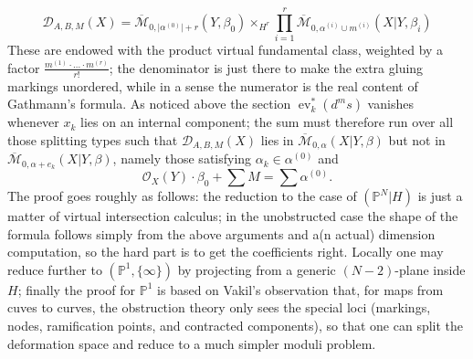 \documentclass[11pt]{amsart}
\newcommand{\M}[4]{\overline{\mathcal{M}}_{#1,#2}(#3,#4)}
\newcommand{\PP}{\mathbb P}
\newcommand{\OO}{\mathcal{O}}
\newcommand{\ev}{\operatorname{ev}}
\theoremstyle{definition}
\theoremstyle{definition}
\begin{document}
\[\mathcal{D}_{A,B,M}(X)=\M{0}{\lvert\alpha^{(0)}\rvert+r}{Y}{\beta_0}\times_{H^r}\prod_{i=1}^r
\M{0}{\alpha^{(i)}\cup m^{(i)}}{X|Y}{\beta_i}\]
These are endowed with the product virtual fundamental class, weighted by a factor $\frac{m^{(1)}\cdot\ldots\cdot m^{(r)}}{r!}$; the denominator is just there to make the extra gluing markings unordered, while in a sense the numerator is the real content of Gathmann's formula. As noticed above the section $\ev_k^*(d^ms)$ vanishes whenever $x_k$ lies on an internal component; the sum must therefore run over all those splitting types such that $\mathcal{D}_{A,B,M}(X)$ lies in $\M{0}{\alpha}{X|Y}{\beta}$ but not in $\M{0}{\alpha+e_k}{X|Y}{\beta}$, namely those satisfying $\alpha_k\in\alpha^{(0)}$ and
\[\OO_X(Y)\cdot\beta_0+\sum M=\sum \alpha^{(0)}.\]
The proof goes roughly as follows: the reduction to the case of $(\PP^N|H)$ is just a matter of virtual intersection calculus; in the unobstructed case the shape of the formula follows simply from the above arguments and a(n actual) dimension computation, so the hard part is to get the coefficients right. Locally one may reduce further to $(\PP^1,\{\infty\})$ by projecting from a generic $(N-2)$-plane inside $H$; finally the proof for $\PP^1$ is based on Vakil's observation that, for maps from cuves to curves, the obstruction theory only sees the special loci (markings, nodes, ramification points, and contracted components), so that one can split the deformation space and reduce to a much simpler moduli problem.
\end{document}
